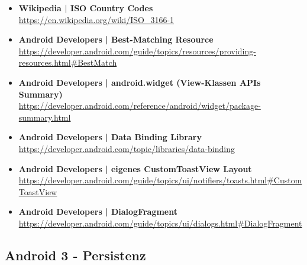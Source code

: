 \documentclass[a4paper]{article}
\begin{document}
\begin{itemize}
			\item \textbf{Wikipedia | ISO Country Codes}\\
			\href{https://en.wikipedia.org/wiki/ISO_3166-1}
			{https://en.wikipedia.org/wiki/ISO\_3166-1}
			
			\item \textbf{Android Developers | Best-Matching Resource}\\
			\href{https://developer.android.com/guide/topics/resources/providing-resources.html#BestMatch}
			{https://developer.android.com/guide/topics/resources/providing-resources.html\#BestMatch}
			
			\item \textbf{Android Developers | android.widget (View-Klassen APIs Summary)}\\
			\href{https://developer.android.com/reference/android/widget/package-summary.html}
			{https://developer.android.com/reference/android/widget/package-summary.html}
			
			\item \textbf{Android Developers | Data Binding Library}\\
			\href{https://developer.android.com/topic/libraries/data-binding}
			{https://developer.android.com/topic/libraries/data-binding}
			
			\item \textbf{Android Developers | eigenes CustomToastView Layout}\\
			\href{https://developer.android.com/guide/topics/ui/notifiers/toasts.html#CustomToastView}
			{https://developer.android.com/guide/topics/ui/notifiers/toasts.html\#CustomToastView}
			
			\item \textbf{Android Developers | DialogFragment}\\
			\href{https://developer.android.com/guide/topics/ui/dialogs.html#DialogFragment}
			{https://developer.android.com/guide/topics/ui/dialogs.html\#DialogFragment}
			
			
		\end{itemize}
		
		\subsection{Android 3 - Persistenz}
		
\end{document}

